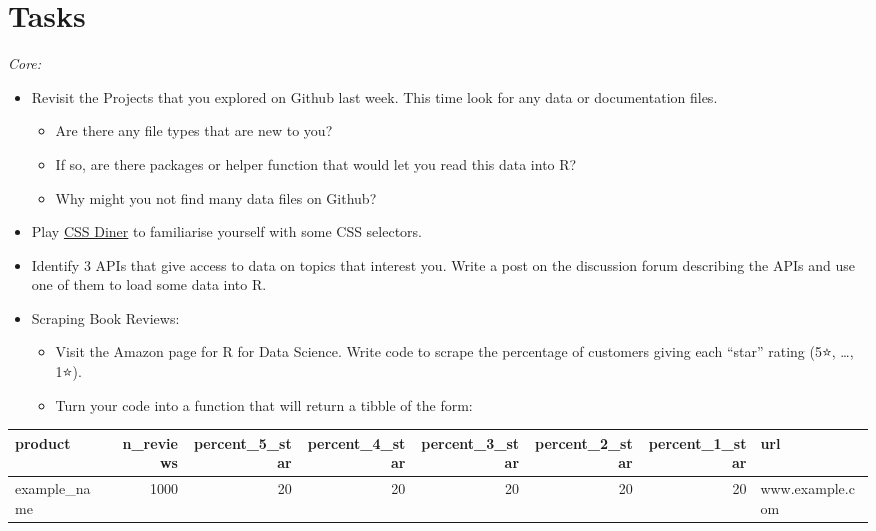 \documentclass[
  12pt,
]{book}
\providecommand{\tightlist}{%
  \setlength{\itemsep}{0pt}\setlength{\parskip}{0pt}}
\begin{document}
\hypertarget{tasks-1}{%
\section*{Tasks}\label{tasks-1}}

\emph{Core:}

\begin{itemize}
\item
  Revisit the Projects that you explored on Github last week. This time look for any data or documentation files.

  \begin{itemize}
  \tightlist
  \item
    Are there any file types that are new to you?
  \item
    If so, are there packages or helper function that would let you read this data into R?
  \item
    Why might you not find many data files on Github?
  \end{itemize}
\item
  Play \href{https://flukeout.github.io/}{CSS Diner} to familiarise yourself with some CSS selectors.
\item
  Identify 3 APIs that give access to data on topics that interest you. Write a post on the discussion forum describing the APIs and use one of them to load some data into R.
\item
  Scraping Book Reviews:

  \begin{itemize}
  \tightlist
  \item
    Visit the Amazon page for R for Data Science. Write code to scrape the percentage of customers giving each ``star'' rating (5⭐, \ldots, 1⭐).
  \item
    Turn your code into a function that will return a tibble of the form:
  \end{itemize}
\end{itemize}

\begin{tabular}{l|r|r|r|r|r|r|l}
\hline
product & n\_reviews & percent\_5\_star & percent\_4\_star & percent\_3\_star & percent\_2\_star & percent\_1\_star & url\\
\hline
example\_name & 1000 & 20 & 20 & 20 & 20 & 20 & www.example.com\\
\hline
\end{tabular}
\end{document}
